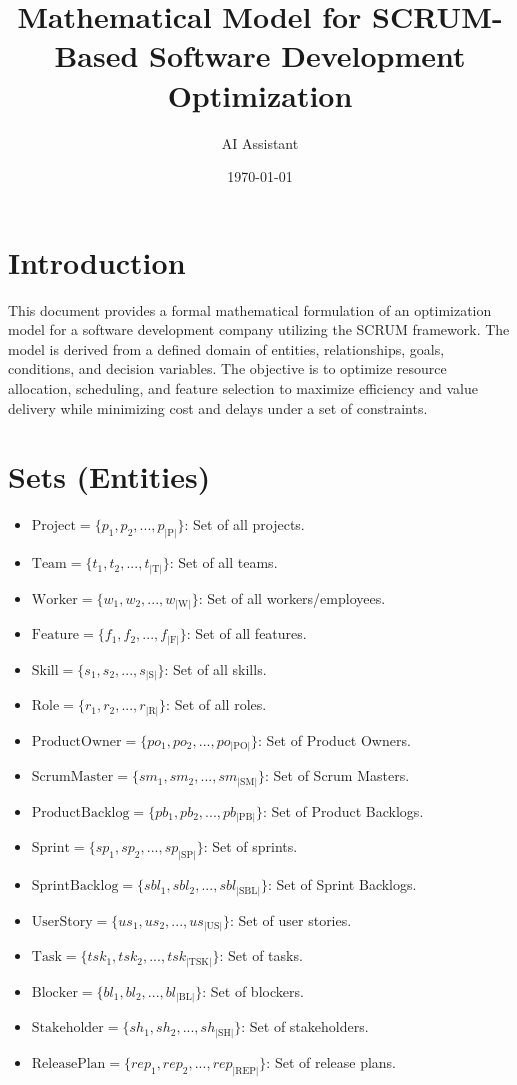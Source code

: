 \documentclass[11pt]{article}
\title{Mathematical Model for SCRUM-Based Software Development Optimization}
\author{AI Assistant}
\date{\today}
\begin{document}
\maketitle
\tableofcontents
\newpage

\section*{Introduction}
This document provides a formal mathematical formulation of an optimization model for a software development company utilizing the SCRUM framework. The model is derived from a defined domain of entities, relationships, goals, conditions, and decision variables. The objective is to optimize resource allocation, scheduling, and feature selection to maximize efficiency and value delivery while minimizing cost and delays under a set of constraints.

\section{Sets (Entities)}
\begin{itemize}
    \item $\text{Project} = \{p_1, p_2, ..., p_{|\text{P}|}\}$: Set of all projects.
    \item $\text{Team} = \{t_1, t_2, ..., t_{|\text{T}|}\}$: Set of all teams.
    \item $\text{Worker} = \{w_1, w_2, ..., w_{|\text{W}|}\}$: Set of all workers/employees.
    \item $\text{Feature} = \{f_1, f_2, ..., f_{|\text{F}|}\}$: Set of all features.
    \item $\text{Skill} = \{s_1, s_2, ..., s_{|\text{S}|}\}$: Set of all skills.
    \item $\text{Role} = \{r_1, r_2, ..., r_{|\text{R}|}\}$: Set of all roles.
    \item $\text{ProductOwner} = \{po_1, po_2, ..., po_{|\text{PO}|}\}$: Set of Product Owners.
    \item $\text{ScrumMaster} = \{sm_1, sm_2, ..., sm_{|\text{SM}|}\}$: Set of Scrum Masters.
    \item $\text{ProductBacklog} = \{pb_1, pb_2, ..., pb_{|\text{PB}|}\}$: Set of Product Backlogs.
    \item $\text{Sprint} = \{sp_1, sp_2, ..., sp_{|\text{SP}|}\}$: Set of sprints.
    \item $\text{SprintBacklog} = \{sbl_1, sbl_2, ..., sbl_{|\text{SBL}|}\}$: Set of Sprint Backlogs.
    \item $\text{UserStory} = \{us_1, us_2, ..., us_{|\text{US}|}\}$: Set of user stories.
    \item $\text{Task} = \{tsk_1, tsk_2, ..., tsk_{|\text{TSK}|}\}$: Set of tasks.
    \item $\text{Blocker} = \{bl_1, bl_2, ..., bl_{|\text{BL}|}\}$: Set of blockers.
    \item $\text{Stakeholder} = \{sh_1, sh_2, ..., sh_{|\text{SH}|}\}$: Set of stakeholders.
    \item $\text{ReleasePlan} = \{rep_1, rep_2, ..., rep_{|\text{REP}|}\}$: Set of release plans.
\end{itemize}
\end{document}
